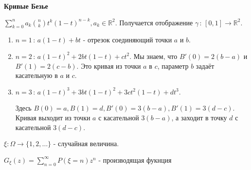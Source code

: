 \textbf{Кривые Безье}

$\sum_{k = 0}^n a_k \binom{n}{k} t^k (1 - t)^{n - k}, a_k \in \mathbb{R}^2$. Получается
отображение $\gamma \, : \, [0, 1] \to \mathbb{R}^2$.

\begin{enumerate}
    \item {
        $n = 1 \, : \, a(1 - t) + bt$ - отрезок соединяющий точки $a$ и $b$.
    }
    \item {
        $n = 2 \, : \, a(1 - t)^2 + 2bt(1 - t) + ct^2$. Мы знаем, что $B'(0) = 2(b - a)$ и $B'(1) = 2(c - b)$.
        Это кривая из точки $a$ в $c$, параметр $b$ задаёт касательную в $a$ и $c$.
    }
    \item {
        $n = 3 \, : \, a(1 - t)^3 + 3bt(1-t)^2 + 3ct^2(1 - t) + dt^3$.

        Здесь $B(0) = a, B(1) = d, B'(0) = 3(b - a), B'(1) = 3(d - c)$. Кривая выходит
        из точки $a$ с касательной $3(b - a)$, а заходит в точку $d$ с касательной $3(d - c)$.
    }
\end{enumerate}


\begin{definition}
    $\xi : \Omega \to \{ 1, 2, \ldots \}$ - случайная величина.

    $G_{\xi} (z) = \sum_{n=0}^{\infty} P(\xi = n)z^n$ - производящая фукнция
\end{definition}

